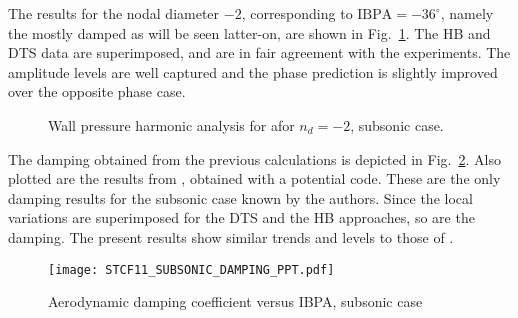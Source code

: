 The results for the  nodal  diameter $-2$, corresponding to $\text{IBPA}=-36^\circ$, namely
the mostly damped as will be seen latter-on, are shown
in Fig.~\ref{fig:stcf11_ael_subsonic_ibpa_324_paper}. The HB and DTS data
are superimposed, and are in fair agreement with the experiments. The
amplitude levels are well captured and the phase prediction is
slightly improved over the opposite phase case.
\begin{figure}[htb!]
  \centering
  \caption{Wall pressure harmonic analysis for afor \mbox{$n_d=-2$}, subsonic case.}
  \label{fig:stcf11_ael_subsonic_ibpa_324_paper}
\end{figure}

The damping obtained from the previous calculations is depicted 
in Fig.~\ref{fig:stcf11_subsonic_damping}.  Also plotted are the results
from \citet{Fransson1999}, obtained with a
potential code.
These are the only damping results for the
subsonic case known by the authors.  Since the local variations are
superimposed for the DTS and the HB approaches, so are the damping.
The present
results show similar trends and levels to those of \citet{Fransson1999}.
\begin{figure}[htb!]
  \centering
  \texttt{[image: STCF11\_SUBSONIC\_DAMPING\_PPT.pdf]}
  \caption{Aerodynamic damping coefficient versus IBPA, subsonic case}
  \label{fig:stcf11_subsonic_damping}
\end{figure}
